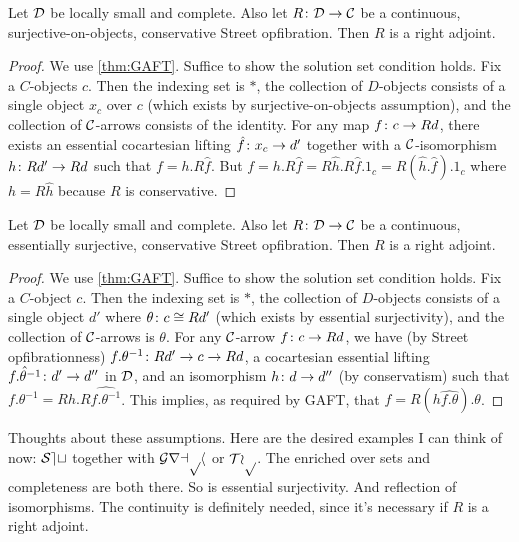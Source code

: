 \documentclass{amsart}
\begin{document}
\begin{thm}
	Let $ \mathcal{D}$ be locally small and complete. Also let $ R \colon \mathcal{D} \to \mathcal{C} $ be a continuous, surjective-on-objects, conservative Street opfibration.  Then $ R $ is a right adjoint.
\end{thm}

\begin{proof}
	We use \ref{thm:GAFT}.  Suffice to show the solution set condition holds.  Fix a $ C $-objects $ c $.  Then the indexing set is $ \ast $, the collection of $ D $-objects consists of a single object $ x_c $ over $ c $ (which exists by surjective-on-objects assumption), and the collection of $ \mathcal{C} $-arrows consists of the identity.  For any map $ f \colon c \to Rd $, there exists an essential cocartesian lifting $ \hat{f} \colon x_c \to d' $ together with a $ \mathcal{C} $-isomorphism $ h \colon Rd' \to Rd $ such that $ f = h . R \hat{f} $. But $ f = h . R \hat{f} = R \hat{h} . R \hat{f} . 1_c = R (\hat{h} . \hat{f}) . 1_c $ where $ h = R \hat{h} $ because $ R $ is conservative.
\end{proof}

\begin{thm}
	Let $ \mathcal{D}$ be locally small and complete. Also let $ R \colon \mathcal{D} \to \mathcal{C} $ be a continuous, essentially surjective, conservative Street opfibration.  Then $ R $ is a right adjoint.
\end{thm}

\begin{proof}
	We use \ref{thm:GAFT}.  Suffice to show the solution set condition holds.  Fix a $ C $-object $ c $.  Then the indexing set is $ \ast $, the collection of $ D $-objects consists of a single object $ d' $ where $ \theta \colon c \cong Rd' $ (which exists by essential surjectivity), and the collection of $ \mathcal{C} $-arrows is $ { \theta } $.  For any $ \mathcal{C} $-arrow $ f \colon c \to Rd $, we have (by Street opfibrationness) $ f . \theta^{-1} \colon Rd' \to c \to Rd $, a cocartesian essential lifting $ \hat{ f . \theta^{-1} } \colon d' \to d'' $ in $ \mathcal{D} $, and an isomorphism $ h \colon d \to d'' $ (by conservatism) such that $ f . \theta^{-1} = Rh . R \hat{ f . \theta^{-1} } $.  This implies, as required by GAFT, that $ f = R (h\hat{ f . \theta }) . \theta $.
\end{proof}

Thoughts about these assumptions. Here are the desired examples I can think of now: $ \mathcal{Set} $ together with $ \mathcal{Graph} $ or $ \mathcal{Top} $. The enriched over sets and completeness are both there. So is essential surjectivity. And reflection of isomorphisms.  The continuity is definitely needed, since it's necessary if $ R $ is a right adjoint. 
\end{document}
